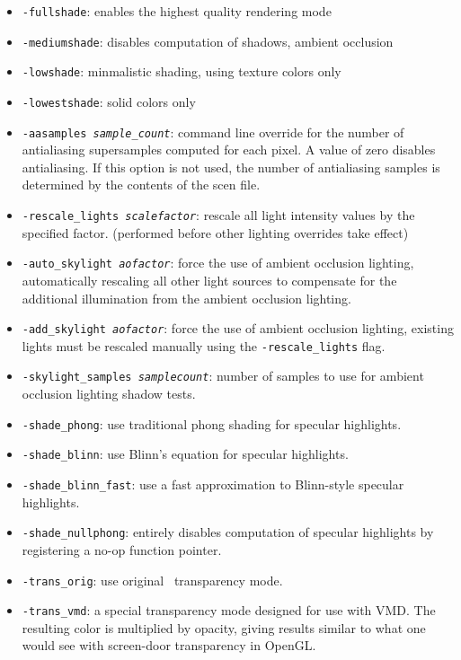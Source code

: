 \begin{itemize}
\item{{\tt -fullshade}}: enables the highest quality rendering mode
\item{{\tt -mediumshade}}: disables computation of shadows, ambient occlusion
\item{{\tt -lowshade}}: minmalistic shading, using texture colors only
\item{{\tt -lowestshade}}: solid colors only
\item{{\tt -aasamples {\it sample\_count}}}: command line override for the number of 
      antialiasing supersamples computed for each pixel.  A value of
      zero disables antialiasing.  If this option is not used, the number
      of antialiasing samples is determined by the contents of the scen file.
\item{{\tt -rescale\_lights {\it scalefactor}}}: 
                              rescale all light intensity values by the
                              specified factor.  (performed before other
                              lighting overrides take effect)
\item{{\tt -auto\_skylight {\it aofactor}}}: 
                              force the use of ambient occlusion lighting,
                              automatically rescaling all other light sources
                              to compensate for the additional illumination
                              from the ambient occlusion lighting.
\item{{\tt -add\_skylight {\it aofactor}}}:
                              force the use of ambient occlusion lighting,
                              existing lights must be rescaled manually using
                              the {\tt -rescale\_lights} flag.
\item{{\tt -skylight\_samples {\it samplecount}}}: 
                              number of samples to use for ambient occlusion
                              lighting shadow tests.
\item{{\tt -shade\_phong}}: use traditional phong shading for specular
      highlights.
\item{{\tt -shade\_blinn}}: use Blinn's equation for specular highlights.
\item{{\tt -shade\_blinn\_fast}}: use a fast approximation to Blinn-style
      specular highlights.
\item{{\tt -shade\_nullphong}}: entirely disables computation of
      specular highlights by registering a no-op function pointer.
\item{{\tt -trans\_orig}}: use original \RAY\ transparency mode.
\item{{\tt -trans\_vmd}}: a special transparency mode designed for
      use with VMD.  The resulting color is multiplied by opacity, 
      giving results similar to what one would see with screen-door
      transparency in OpenGL.
\end{itemize}


